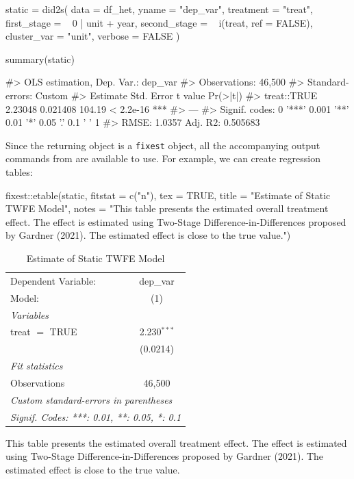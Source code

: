 \begin{Schunk}
\begin{Sinput}
static = did2s(
    data = df_het, 
    yname = "dep_var", 
    treatment = "treat",
    first_stage = ~ 0 | unit + year, 
    second_stage = ~ i(treat, ref = FALSE),
    cluster_var = "unit", 
    verbose = FALSE
)

summary(static)
\end{Sinput}
\begin{Soutput}
#> OLS estimation, Dep. Var.: dep_var
#> Observations: 46,500 
#> Standard-errors: Custom 
#>             Estimate Std. Error t value  Pr(>|t|)    
#> treat::TRUE  2.23048   0.021408  104.19 < 2.2e-16 ***
#> ---
#> Signif. codes:  0 '***' 0.001 '**' 0.01 '*' 0.05 '.' 0.1 ' ' 1
#> RMSE: 1.0357   Adj. R2: 0.505683
\end{Soutput}
\end{Schunk}

Since the returning object is a \texttt{fixest} object, all the
accompanying output commands from  are available to use.
For example, we can create regression tables:

\begin{Sinput}
fixest::etable(static, fitstat = c("n"), tex = TRUE,
  title = "Estimate of Static TWFE Model", 
  notes = "This table presents the estimated overall treatment effect. The effect is estimated using Two-Stage Difference-in-Differences proposed by Gardner (2021). The estimated effect is close to the true value.")
\end{Sinput}
\begin{table}[htbp]
   \caption{Estimate of Static TWFE Model}
   \centering
   \begin{tabular}{lc}
      \tabularnewline \midrule \midrule
      Dependent Variable: & dep\_var\\   
      Model:              & (1)\\  
      \midrule
      \emph{Variables}\\
      treat $=$ TRUE      & 2.230$^{***}$\\   
                          & (0.0214)\\   
      \midrule
      \emph{Fit statistics}\\
      Observations        & 46,500\\  
      \midrule \midrule
      \multicolumn{2}{l}{\emph{Custom standard-errors in parentheses}}\\
      \multicolumn{2}{l}{\emph{Signif. Codes: ***: 0.01, **: 0.05, *: 0.1}}\\
   \end{tabular}
   
   \par \raggedright 
   This table presents the estimated overall treatment effect. The effect is estimated using Two-Stage Difference-in-Differences proposed by Gardner (2021). The estimated effect is close to the true value.
\end{table}

